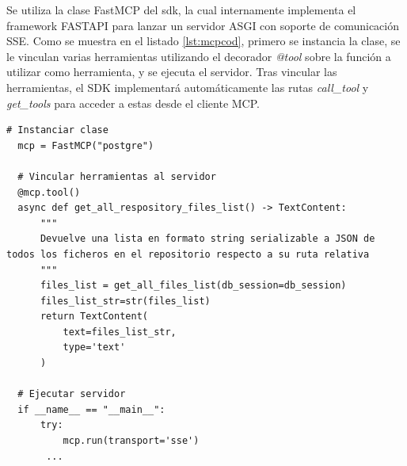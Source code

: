 \begin{itemize}
  Se utiliza la clase FastMCP del sdk, la cual internamente implementa el framework FASTAPI para lanzar un servidor ASGI con soporte de comunicación SSE. Como se muestra en el listado \ref{lst:mcpcod}, primero se instancia la clase, se le vinculan varias herramientas utilizando el decorador \textit{@tool} sobre la función a utilizar como herramienta, y se ejecuta el servidor. Tras vincular las herramientas, el SDK implementará automáticamente las rutas \textit{call\_tool} y \textit{get\_tools} para acceder a estas desde el cliente MCP.

\begin{lstlisting}[caption={Implementación de servidor MCP con SDK de python},label={lst:mcpcod}]
  # Instanciar clase 
  mcp = FastMCP("postgre")

  # Vincular herramientas al servidor
  @mcp.tool()
  async def get_all_respository_files_list() -> TextContent:
      """
      Devuelve una lista en formato string serializable a JSON de todos los ficheros en el repositorio respecto a su ruta relativa
      """
      files_list = get_all_files_list(db_session=db_session)
      files_list_str=str(files_list)
      return TextContent(
          text=files_list_str,
          type='text'
      )

  # Ejecutar servidor
  if __name__ == "__main__":
      try:
          mcp.run(transport='sse')
       ...

\end{lstlisting}


\end{itemize}

